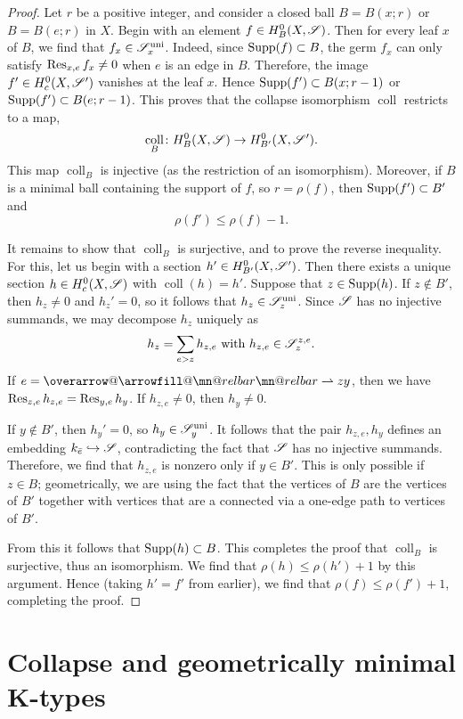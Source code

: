 \documentclass[letter]{amsart}
\makeatletter
\theoremstyle{definition}
\theoremstyle{remark}
\numberwithin{thm}{section}
\numberwithin{equation}{section}
\DeclareRobustCommand{\overrightharpoon}{\mathpalette{\overarrow@\rightharpoonfill@}}
\def\rightharpoonfill@{\arrowfill@\mn@relbar\mn@relbar\rightharpoonup}
\newcommand{\edge}[1]{\overrightharpoon{#1}}
\DeclareMathOperator{\uni}{uni}
\DeclareMathOperator{\coll}{coll}
\makeatother
\begin{document}
\begin{proof}
Let $r$ be a positive integer, and consider a closed ball $B = B(x;r)$ or $B = B(e;r)$ in $X$.  Begin with an element $f \in H_B^0(X, {\mathscr{S}})$.  Then for every leaf $x$ of $B$, we find that $f_x \in \sheaf{S}_x^{\uni}$.  Indeed, since $\operatorname{Supp}(f) \subset B$, the germ $f_x$ can only satisfy $\operatorname{Res}_{x,e} f_x \neq 0$ when $e$ is an edge in $B$.  Therefore, the image $f' \in H_c^0(X, {\mathscr{S}}')$ vanishes at the leaf $x$.  Hence $\operatorname{Supp}(f') \subset B(x;r-1)$ or $\operatorname{Supp}(f') \subset B(e;r-1)$.  This proves that the collapse isomorphism $\coll$ restricts to a map,
$$\coll_B \From H_B^0(X, \sheaf{S}) \To H_{B'}^0(X, \sheaf{S}').$$
This map $\coll_B$ is injective (as the restriction of an isomorphism).  Moreover, if $B$ is a minimal ball containing the support of $f$, so $r = \rho(f)$, then $\operatorname{Supp}(f') \subset B'$ and 
$$\rho(f') \leq \rho(f) - 1.$$

It remains to show that $\coll_B$ is surjective, and to prove the reverse inequality.  For this, let us begin with a section $h' \in H_{B'}^0(X, {\mathscr{S}}')$.  Then there exists a unique section $h \in H_c^0(X, {\mathscr{S}})$ with $\coll(h) = h'$.  Suppose that $z \in \operatorname{Supp}(h)$.  If $z \not \in B'$, then $h_z \neq 0$ and $h_z' = 0$, so it follows that $h_z \in \sheaf{S}_z^{\uni}$.  Since ${\mathscr{S}}$ has no injective summands, we may decompose $h_z$ uniquely as
$$h_z = \sum_{e > z} h_{z,e} \text{ with } h_{z,e} \in {\mathscr{S}}_z^{z,e}.$$
If $e = \edge{zy}$, then we have $\operatorname{Res}_{z,e} h_{z,e} = \operatorname{Res}_{y,e} h_y$.  If $h_{z,e} \neq 0$, then $h_y \neq 0$.

If $y \not \in B'$, then $h_y' = 0$, so $h_y \in \sheaf{S}_y^{\uni}$.  It follows that the pair $h_{z,e}, h_y$ defines an embedding $k_{\bar e} \hookrightarrow {\mathscr{S}}$, contradicting the fact that ${\mathscr{S}}$ has no injective summands.  Therefore, we find that $h_{z,e}$ is nonzero only if $y \in B'$.  This is only possible if $z \in B$; geometrically, we are using the fact that the vertices of $B$ are the vertices of $B'$ together with vertices that are a connected via a one-edge path to vertices of $B'$.  

From this it follows that $\operatorname{Supp}(h) \subset B$.  This completes the proof that $\coll_B$ is surjective, thus an isomorphism.  We find that $\rho(h) \leq \rho(h') + 1$ by this argument.  Hence (taking $h' = f'$ from earlier), we find that $\rho(f) \leq \rho(f') + 1$, completing the proof.
\end{proof}

\section{Collapse and geometrically minimal K-types}
\end{document}
